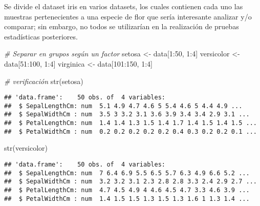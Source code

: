 \documentclass[
]{article}
\newenvironment{Shaded}{\begin{snugshade}}{\end{snugshade}}
\newcommand{\CommentTok}[1]{\textcolor[rgb]{0.56,0.35,0.01}{\textit{#1}}}
\newcommand{\DecValTok}[1]{\textcolor[rgb]{0.00,0.00,0.81}{#1}}
\newcommand{\FunctionTok}[1]{\textcolor[rgb]{0.00,0.00,0.00}{#1}}
\newcommand{\NormalTok}[1]{#1}
\newcommand{\OtherTok}[1]{\textcolor[rgb]{0.56,0.35,0.01}{#1}}
\newcommand{\SpecialCharTok}[1]{\textcolor[rgb]{0.00,0.00,0.00}{#1}}
\begin{document}
Se divide el dataset iris en varios datasets, los cuales contienen cada
uno las muestras pertenecientes a una especie de flor que sería
interesante analizar y/o comparar; sin embargo, no todos se utilizarían
en la realización de pruebas estadísticas posteriores.

\begin{Shaded}
\begin{Highlighting}[]
\CommentTok{\# Separar en grupos según un factor}
\NormalTok{setosa }\OtherTok{\textless{}{-}}\NormalTok{ data[}\DecValTok{1}\SpecialCharTok{:}\DecValTok{50}\NormalTok{, }\DecValTok{1}\SpecialCharTok{:}\DecValTok{4}\NormalTok{]}
\NormalTok{versicolor }\OtherTok{\textless{}{-}}\NormalTok{ data[}\DecValTok{51}\SpecialCharTok{:}\DecValTok{100}\NormalTok{, }\DecValTok{1}\SpecialCharTok{:}\DecValTok{4}\NormalTok{]}
\NormalTok{virginica }\OtherTok{\textless{}{-}}\NormalTok{ data[}\DecValTok{101}\SpecialCharTok{:}\DecValTok{150}\NormalTok{, }\DecValTok{1}\SpecialCharTok{:}\DecValTok{4}\NormalTok{]}
\end{Highlighting}
\end{Shaded}

\begin{Shaded}
\begin{Highlighting}[]
\CommentTok{\# verificación}
\FunctionTok{str}\NormalTok{(setosa)}
\end{Highlighting}
\end{Shaded}

\begin{verbatim}
## 'data.frame':    50 obs. of  4 variables:
##  $ SepalLengthCm: num  5.1 4.9 4.7 4.6 5 5.4 4.6 5 4.4 4.9 ...
##  $ SepalWidthCm : num  3.5 3 3.2 3.1 3.6 3.9 3.4 3.4 2.9 3.1 ...
##  $ PetalLengthCm: num  1.4 1.4 1.3 1.5 1.4 1.7 1.4 1.5 1.4 1.5 ...
##  $ PetalWidthCm : num  0.2 0.2 0.2 0.2 0.2 0.4 0.3 0.2 0.2 0.1 ...
\end{verbatim}

\begin{Shaded}
\begin{Highlighting}[]
\FunctionTok{str}\NormalTok{(versicolor)}
\end{Highlighting}
\end{Shaded}

\begin{verbatim}
## 'data.frame':    50 obs. of  4 variables:
##  $ SepalLengthCm: num  7 6.4 6.9 5.5 6.5 5.7 6.3 4.9 6.6 5.2 ...
##  $ SepalWidthCm : num  3.2 3.2 3.1 2.3 2.8 2.8 3.3 2.4 2.9 2.7 ...
##  $ PetalLengthCm: num  4.7 4.5 4.9 4 4.6 4.5 4.7 3.3 4.6 3.9 ...
##  $ PetalWidthCm : num  1.4 1.5 1.5 1.3 1.5 1.3 1.6 1 1.3 1.4 ...
\end{verbatim}
\end{document}
